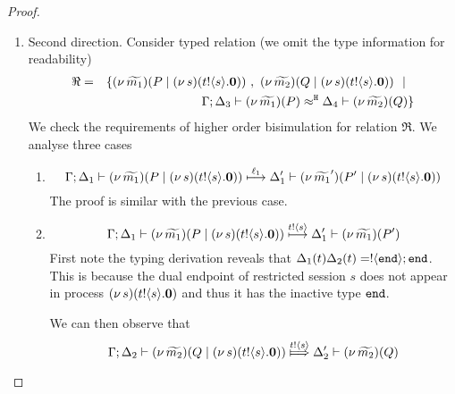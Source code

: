 \begin{proof}
\begin{enumerate}
		\item	Second direction. Consider typed relation (we omit the type information for readability)
				\begin{eqnarray*}
					\Re &=& \set{	\newsp{\widetilde{m_1}}{P \Par \newsp{s}{\bout{t}{s} \inact}}\ , \ 
									\newsp{\widetilde{m_2}}{Q \Par \newsp{s}{\bout{t}{s} \inact}} \setbar\\
					&&
									\horel{\Gamma}{\Delta_3}{\newsp{\widetilde{m_1}}{P  } }
									{\hwb}
									{\Delta_4}{\newsp{\widetilde{m_2}}{Q  } }
					}	
				\end{eqnarray*}
				We check the requirements of higher order bisimulation
				for relation $\Re$.
				We analyse three cases
				\begin{enumerate}
					\item
							\[
								\Gamma; \Delta_1 \vdash (\nu\, \widetilde{m_1})(P \;|\; (\nu\, s)(t ! \langle s \rangle . \mathbf{0})  )  \stackrel{\ell_1}{\longmapsto} \Delta_1' \vdash (\nu\, \widetilde{m_1}')(P' \;|\; (\nu\, s)(t ! \langle s \rangle . \mathbf{0}))
							\]
							The proof is similar with the previous case.

					\item	\[
								\Gamma; \Delta_1 \vdash (\nu\, \widetilde{m_1})(P \;|\; (\nu\, s)(t ! \langle s \rangle . \mathbf{0})  )  \stackrel{t ! \langle s \rangle}{\longmapsto}  \Delta_1' \vdash (\nu\, \widetilde{m_1})(P')
							\]
							First note the typing derivation
							reveals that $\Delta_1(t) \Delta_2(t) = ! \langle \mathtt{end} \rangle ; \mathtt{end}$.
							This is because the dual endpoint of restricted session $s$ does not appear
							in process $(\nu\, s)(t ! \langle s \rangle . \mathbf{0})$ and thus it has the inactive type $\mathtt{end}$.

							We can then observe that
							\[
								\horel{\Gamma}{\Delta_2}{\newsp{\widetilde{m_2}}{Q \Par \newsp{s}{\bout{t}{s} \inact}  } }
								{\Hby{\bactout{t}{s}} }
								{\Delta_2'}{\newsp{\widetilde{m_2}}{Q}}
							\]


\end{enumerate}
\end{enumerate}
\end{proof}
